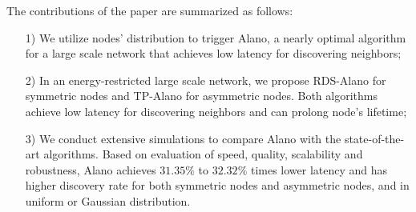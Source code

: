 The contributions of the paper are summarized as follows:
\begin{itemize}
\item[1)] We utilize nodes' distribution to trigger Alano, a nearly optimal algorithm for a large scale network that achieves low latency for discovering neighbors;
\item[2)] In an energy-restricted large scale network, we propose RDS-Alano for symmetric nodes and TP-Alano for asymmetric nodes. Both algorithms achieve low latency for discovering neighbors and can prolong node's lifetime;
\item[3)] We conduct extensive simulations to compare Alano with the state-of-the-art algorithms. Based on evaluation of speed, quality, scalability and robustness, Alano achieves $31.35\%$ to $32.32\%$ times lower latency and has higher discovery rate for both symmetric nodes and asymmetric nodes, and in uniform or Gaussian distribution.
\end{itemize}

